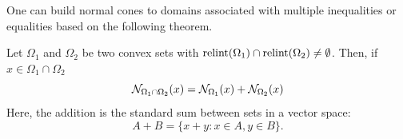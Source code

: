 One can build normal cones to domains associated with multiple inequalities or equalities based on the following theorem.
\begin{theorem}
\label{th:normal.cone.intersect}
Let $\Omega_1$ and $\Omega_2$ be two convex sets with $\mathrm{relint}(\Omega_1) \cap \mathrm{relint}(\Omega_2) \neq \emptyset$. Then, if $x\in \Omega_1\cap \Omega_2$
\[
{\mathcal N}_{\Omega_1\cap \Omega_2} (x) = {\mathcal N}_{\Omega_1} (x) + {\mathcal N}_{\Omega_2} (x) 
\] 
Here, the addition is the standard sum between sets in a vector space:
\[
A+B = \{x+y: x\in A, y\in B\}.
\]
\end{theorem} 
%



